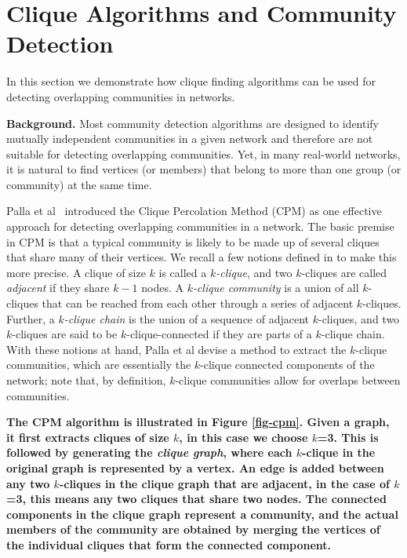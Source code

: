 \section{Clique Algorithms and Community Detection}
\label{sec:applications}

In this section we demonstrate how clique finding algorithms can be used for detecting overlapping communities in networks. 


{\bf Background. }
Most community detection algorithms are designed to identify mutually independent communities in a given network and therefore are not suitable for detecting overlapping communities. Yet, in many real-world networks, it is natural to find vertices (or members) that belong to more than one group (or community) at the same time.

Palla et al~\cite{cite-key} introduced the Clique Percolation Method (CPM) 
as one effective approach for detecting overlapping communities in a network. 
The basic premise in CPM is that a typical community is likely to be made up of several cliques that share many of their vertices.  
We recall a few notions defined in \cite{cite-key} to make this more precise.
A clique of size $k$ is called a {\em $k$-clique}, and   
two $k$-cliques are called {\em adjacent} if they share $k - 1$ nodes. 
A {\em $k$-clique community} is a union of all $k$-cliques that can be reached 
from each other through a series of adjacent $k$-cliques. 
Further, a {\em $k$-clique chain} is the union of a sequence of adjacent $k$-cliques, and
two $k$-cliques are said to be $k$-clique-connected if they are parts of a $k$-clique chain. With these notions at hand, Palla et al devise a method to extract the $k$-clique communities, which  are essentially the $k$-clique connected components of the network; 
note that, by definition, $k$-clique communities allow for
overlaps between communities.

{\bf The CPM algorithm is illustrated in Figure \ref{fig-cpm}. Given a graph, it first extracts cliques of size $k$, in this case we choose $k$=3. This is followed by generating the {\it clique graph}, where each $k$-clique in the original graph is represented by a vertex. An edge is added between any two $k$-cliques in the clique graph that are adjacent, in the case of $k$=3, this means any two cliques that share two nodes. The connected components in the clique graph represent a community, and the actual members of the community are obtained by merging the vertices of the individual cliques that form the connected component. }


